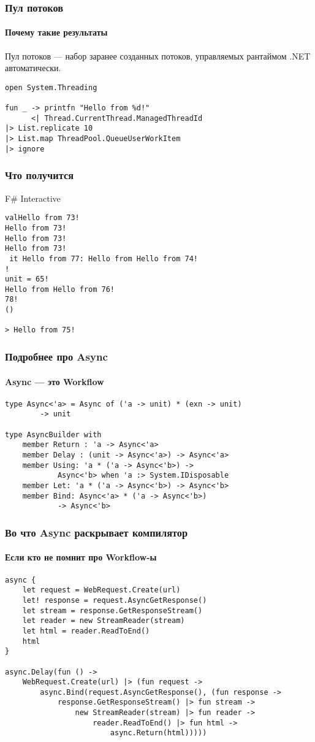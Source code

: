 \documentclass[xetex,mathserif,serif]{beamer}
\begin{document}
	\begin{frame}[fragile]
		\frametitle{Пул потоков}
		\framesubtitle{Почему такие результаты}
		Пул потоков --- набор заранее созданных потоков, управляемых рантаймом .NET автоматически.
		\begin{verbatim}
open System.Threading

fun _ -> printfn "Hello from %d!" 
      <| Thread.CurrentThread.ManagedThreadId
|> List.replicate 10
|> List.map ThreadPool.QueueUserWorkItem 
|> ignore
		\end{verbatim}
	\end{frame}

	\begin{frame}[fragile]
		\frametitle{Что получится}
		\begin{alertblock}{F\# Interactive}
			\begin{verbatim}
valHello from 73! 
Hello from 73! 
Hello from 73! 
Hello from 73! 
 it Hello from 77: Hello from Hello from 74! 
! 
unit = 65! 
Hello from Hello from 76! 
78! 
()

> Hello from 75! 
			\end{verbatim}
		\end{alertblock}
	\end{frame}

	\begin{frame}[fragile]
		\frametitle{Подробнее про Async}
		\framesubtitle{Async --- это Workflow}
		\begin{verbatim}
type Async<'a> = Async of ('a -> unit) * (exn -> unit) 
        -> unit

type AsyncBuilder with
    member Return : 'a -> Async<'a>
    member Delay : (unit -> Async<'a>) -> Async<'a>
    member Using: 'a * ('a -> Async<'b>) -> 
            Async<'b> when 'a :> System.IDisposable
    member Let: 'a * ('a -> Async<'b>) -> Async<'b>
    member Bind: Async<'a> * ('a -> Async<'b>) 
            -> Async<'b>
		\end{verbatim}
	\end{frame}

	\begin{frame}[fragile]
		\frametitle{Во что Async раскрывает компилятор}
		\framesubtitle{Если кто не помнит про Workflow-ы}
		\begin{footnotesize}
			\begin{verbatim}
async { 
    let request = WebRequest.Create(url)
    let! response = request.AsyncGetResponse()
    let stream = response.GetResponseStream()
    let reader = new StreamReader(stream)
    let html = reader.ReadToEnd()
    html
} 

async.Delay(fun () ->
    WebRequest.Create(url) |> (fun request ->
        async.Bind(request.AsyncGetResponse(), (fun response ->
            response.GetResponseStream() |> fun stream ->
                new StreamReader(stream) |> fun reader ->
                    reader.ReadToEnd() |> fun html ->
                        async.Return(html)))))
			\end{verbatim}
		\end{footnotesize}
	\end{frame}
\end{document}
